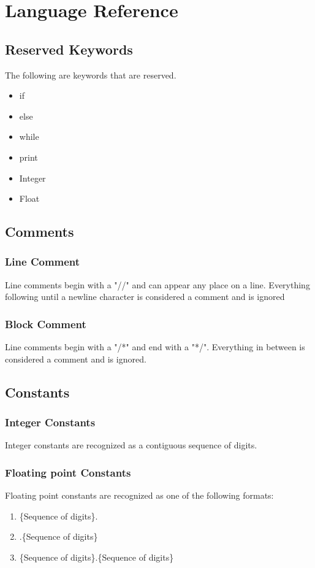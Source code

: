 \documentclass{standalone}
\begin{document}
\chapter{Language Reference}

	\section{Reserved Keywords}
		The following are keywords that are reserved.
		\begin{itemize}
			\item if
			\item else
			\item while
			\item print
			\item Integer
			\item Float
		\end{itemize}

	\section{Comments}
		\subsection{Line Comment}
			Line comments begin with a "//" and can appear any place on a line. Everything following  until a newline character is considered a comment and is ignored
		\subsection{Block Comment}
			Line comments begin with a "/*"  and end with a "*/". Everything in between is considered a comment and is ignored.

	\section{Constants}
		\subsection{Integer Constants}
			Integer constants are recognized as a contiguous sequence of digits.
		\subsection{Floating point Constants}
			Floating point constants are recognized as one of the following formats:
			\begin{enumerate}
				\item \{Sequence of digits\}.
				\item .\{Sequence of digits\}
				\item \{Sequence of digits\}.\{Sequence of digits\}
			\end{enumerate}
\end{document}
